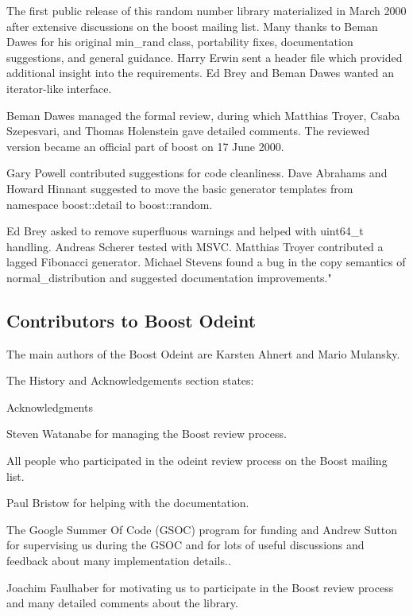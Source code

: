 \vpara
The first public release of this random number library materialized in March 2000 after extensive discussions on the boost mailing list. Many thanks to Beman Dawes for his original min\_rand class, portability fixes, documentation suggestions, and general guidance. Harry Erwin sent a header file which provided additional insight into the requirements. Ed Brey and Beman Dawes wanted an iterator-like interface. 

\vpara
Beman Dawes managed the formal review, during which Matthias Troyer, Csaba Szepesvari, and Thomas Holenstein gave detailed comments. The reviewed version became an official part of boost on 17 June 2000. 

\vpara
Gary Powell contributed suggestions for code cleanliness. Dave Abrahams and Howard Hinnant suggested to move the basic generator templates from namespace boost::detail to boost::random. 

\vpara
Ed Brey asked to remove superfluous warnings and helped with uint64\_t handling. Andreas Scherer tested with MSVC. Matthias Troyer contributed a lagged Fibonacci generator. Michael Stevens found a bug in the copy semantics of normal\_distribution and suggested documentation improvements."







\subsection{Contributors to Boost Odeint}
\label{Contributors to Boost Odeint}
The main authors of the Boost Odeint are Karsten Ahnert  and Mario Mulansky.

\vpara
The History and Acknowledgements section states:

\vpara
Acknowledgments 

Steven Watanabe for managing the Boost review process. 

All people who participated in the odeint review process on the Boost mailing list. 

Paul Bristow for helping with the documentation. 

The Google Summer Of Code (GSOC) program for funding and Andrew Sutton for supervising us during the GSOC and for lots of useful discussions and feedback about many implementation details.. 

Joachim Faulhaber for motivating us to participate in the Boost review process and many detailed comments about the library. 

